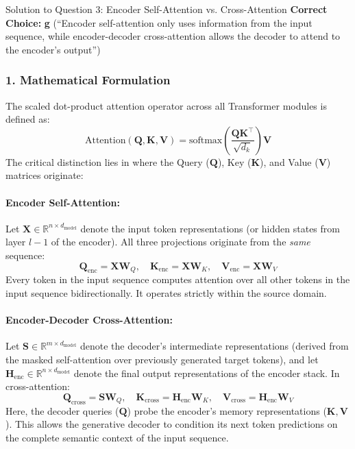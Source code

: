 \documentclass[11pt,a4paper]{article}
\begin{document}
\begin{solutionbox}{Solution to Question 3: Encoder Self-Attention vs. Cross-Attention}
\textbf{Correct Choice:} \textbf{g} (``Encoder self-attention only uses information from the input sequence, while encoder-decoder cross-attention allows the decoder to attend to the encoder's output'')

\subsubsection*{1. Mathematical Formulation}
The scaled dot-product attention operator across all Transformer modules is defined as:
\begin{equation}
    \text{Attention}(\mathbf{Q}, \mathbf{K}, \mathbf{V}) = \text{softmax}\left(\frac{\mathbf{Q} \mathbf{K}^\top}{\sqrt{d_k}}\right) \mathbf{V}
\end{equation}
The critical distinction lies in where the Query ($\mathbf{Q}$), Key ($\mathbf{K}$), and Value ($\mathbf{V}$) matrices originate:

\paragraph{Encoder Self-Attention:}
Let $\mathbf{X} \in \mathbb{R}^{n \times d_{\text{model}}}$ denote the input token representations (or hidden states from layer $l-1$ of the encoder). All three projections originate from the \emph{same} sequence:
\begin{equation}
    \mathbf{Q}_{\text{enc}} = \mathbf{X} \mathbf{W}_Q, \quad \mathbf{K}_{\text{enc}} = \mathbf{X} \mathbf{W}_K, \quad \mathbf{V}_{\text{enc}} = \mathbf{X} \mathbf{W}_V
\end{equation}
Every token in the input sequence computes attention over all other tokens in the input sequence bidirectionally. It operates strictly within the source domain.

\paragraph{Encoder-Decoder Cross-Attention:}
Let $\mathbf{S} \in \mathbb{R}^{m \times d_{\text{model}}}$ denote the decoder's intermediate representations (derived from the masked self-attention over previously generated target tokens), and let $\mathbf{H}_{\text{enc}} \in \mathbb{R}^{n \times d_{\text{model}}}$ denote the final output representations of the encoder stack. In cross-attention:
\begin{equation}
    \mathbf{Q}_{\text{cross}} = \mathbf{S} \mathbf{W}_Q, \quad \mathbf{K}_{\text{cross}} = \mathbf{H}_{\text{enc}} \mathbf{W}_K, \quad \mathbf{V}_{\text{cross}} = \mathbf{H}_{\text{enc}} \mathbf{W}_V
\end{equation}
Here, the decoder queries ($\mathbf{Q}$) probe the encoder's memory representations ($\mathbf{K}, \mathbf{V}$). This allows the generative decoder to condition its next token predictions on the complete semantic context of the input sequence.


\end{solutionbox}
\end{document}
